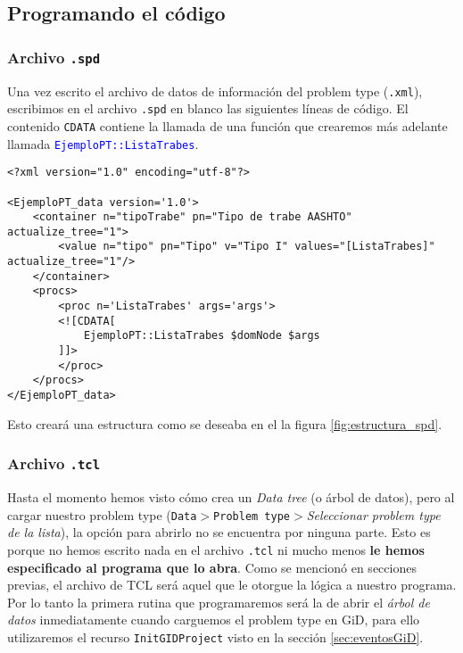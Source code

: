 \documentclass[10pt, a4paper, twocolumn]{article} %
\begin{document}
\subsection{Programando el código}

\subsubsection{Archivo \texttt{.spd}}

Una vez escrito el archivo de datos de información del problem type (\texttt{.xml}), escribimos en el archivo \texttt{.spd} en blanco las siguientes líneas de código. El contenido \texttt{CDATA} contiene la llamada de una función que crearemos más adelante llamada \textcolor{blue}{\texttt{EjemploPT::ListaTrabes}}.

\lstset{language=XML} 
\begin{lstlisting}
<?xml version="1.0" encoding="utf-8"?>

<EjemploPT_data version='1.0'>
	<container n="tipoTrabe" pn="Tipo de trabe AASHTO" actualize_tree="1">
		<value n="tipo" pn="Tipo" v="Tipo I" values="[ListaTrabes]" actualize_tree="1"/>
  	</container>
  	<procs>
    	<proc n='ListaTrabes' args='args'>
      	<![CDATA[
        	EjemploPT::ListaTrabes $domNode $args
      	]]>
    	</proc>
  	</procs>
</EjemploPT_data>
\end{lstlisting}

Esto creará una estructura como se deseaba en el la figura \ref{fig:estructura_spd}.

\subsubsection{Archivo \texttt{.tcl}}

Hasta el momento hemos visto cómo crea un \textit{Data tree} (o árbol de datos), pero al cargar nuestro problem type (\texttt{Data$>$Problem type$>$}\textit{Seleccionar problem type de la lista}), la opción para abrirlo no se encuentra por ninguna parte. Esto es porque no hemos escrito nada en el archivo \texttt{.tcl} ni mucho menos \textbf{le hemos especificado al programa que lo abra}. Como se mencionó en secciones previas, el archivo de TCL será aquel que le otorgue la lógica a nuestro programa. Por lo tanto la primera rutina que programaremos será la de abrir el \textit{árbol de datos} inmediatamente cuando carguemos el problem type en GiD, para ello utilizaremos el recurso \texttt{InitGIDProject} visto en la sección \ref{sec:eventosGiD}.
\end{document}
